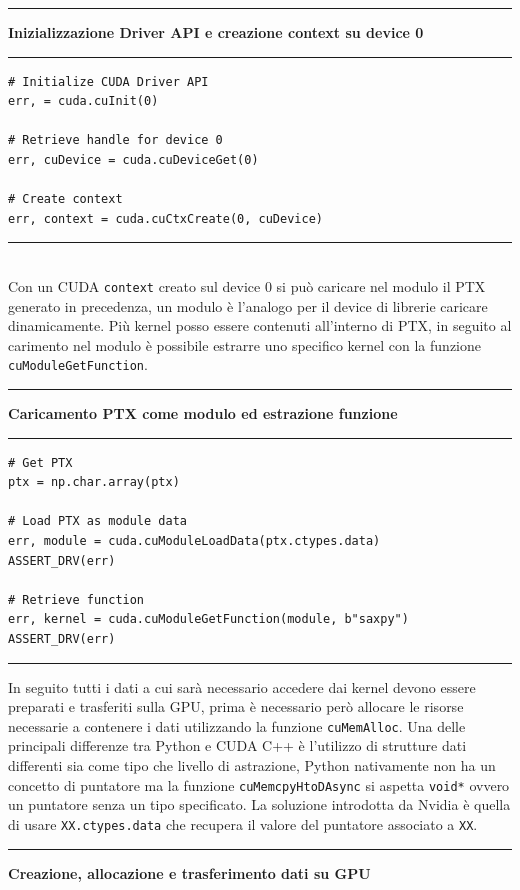\documentclass[12pt,a4paper]{report}
\begin{document}
\noindent\rule[0.5ex]{\linewidth}{2pt}
\small{\textbf{Inizializzazione Driver API e creazione context su device 0}} \\
\noindent\rule[0.5ex]{\linewidth}{1pt}
\begin{lstlisting}
# Initialize CUDA Driver API
err, = cuda.cuInit(0)

# Retrieve handle for device 0
err, cuDevice = cuda.cuDeviceGet(0)

# Create context
err, context = cuda.cuCtxCreate(0, cuDevice)
\end{lstlisting}
\noindent\rule[0.5ex]{\linewidth}{1pt} \\[10pt]
Con un CUDA \verb|context| creato sul device 0 si può caricare nel modulo il PTX generato in precedenza, un modulo è l'analogo per il device di librerie caricare dinamicamente. Più kernel posso essere contenuti all'interno di PTX, in seguito al carimento nel modulo è possibile estrarre uno specifico kernel con la funzione \verb|cuModuleGetFunction|. \\[10pt]
\noindent\rule[0.5ex]{\linewidth}{2pt}
\small{\textbf{Caricamento PTX come modulo ed estrazione funzione}} \\
\noindent\rule[0.5ex]{\linewidth}{1pt}
\begin{lstlisting}
# Get PTX
ptx = np.char.array(ptx)

# Load PTX as module data
err, module = cuda.cuModuleLoadData(ptx.ctypes.data)
ASSERT_DRV(err)

# Retrieve function
err, kernel = cuda.cuModuleGetFunction(module, b"saxpy")
ASSERT_DRV(err)
\end{lstlisting}
\noindent\rule[0.5ex]{\linewidth}{1pt} \newpage
In seguito tutti i dati a cui sarà necessario accedere dai kernel devono essere preparati e trasferiti sulla GPU, prima è necessario però allocare le risorse necessarie a contenere i dati utilizzando la funzione \verb|cuMemAlloc|. \newline
Una delle principali differenze tra Python e CUDA C++ è l'utilizzo di strutture dati differenti sia come tipo che livello di astrazione, Python nativamente non ha un concetto di puntatore ma la funzione \verb|cuMemcpyHtoDAsync| si aspetta \verb|void*| ovvero un puntatore senza un tipo specificato. La soluzione introdotta da Nvidia è quella di usare \verb|XX.ctypes.data| che recupera il valore del puntatore associato a \verb|XX|. \\[10pt]
\noindent\rule[0.5ex]{\linewidth}{2pt}
\small{\textbf{Creazione, allocazione e trasferimento dati su GPU}} \\
\end{document}
